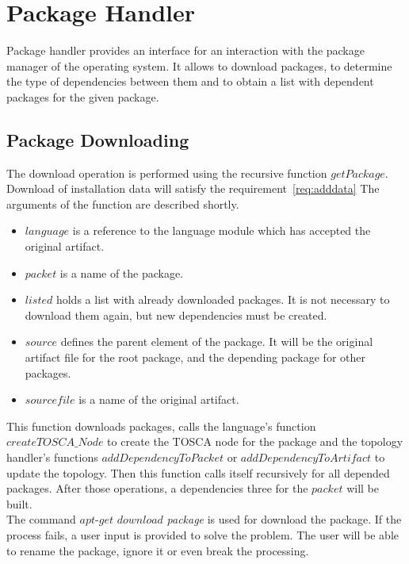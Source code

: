 \section{Package Handler}
Package handler provides an interface for an interaction with the package manager of the operating system.
It allows to download packages, to determine the type of dependencies between them and to obtain a list with dependent packages for the given package.

\subsection*{Package Downloading}
The download operation is performed using the recursive function $getPackage$. 
Download of installation data will satisfy the requirement~\ref{req:adddata}%
The arguments of the function are described shortly.
\begin{itemize}
	\item $language$ is a reference to the language module which has accepted the original artifact.
	\item $packet$ is a name of the package.
	\item $listed$ holds a list with already downloaded packages.
	 It is not necessary to download them again, but new dependencies must be created.
	\item $source$ defines the parent element of the package. 
	It will be the original artifact file for the root package, and the depending package for other packages.
	\item $sourcefile$ is a name of the original artifact.
\end{itemize}
This function downloads packages, calls the language's function $createTOSCA\_Node$ to create the TOSCA node for the package and the topology handler's functions $addDependencyToPacket$ or $addDependencyToArtifact$ to update the topology. Then this function calls itself recursively for all depended packages.
After those operations, a dependencies three for the $packet$ will be built.\\
The command $apt$-$get$ $download$ \emph{package} is used for download the package. 
If the process fails, a user input is provided to solve the problem. 
The user will be able to rename the package, ignore it or even break the processing.

